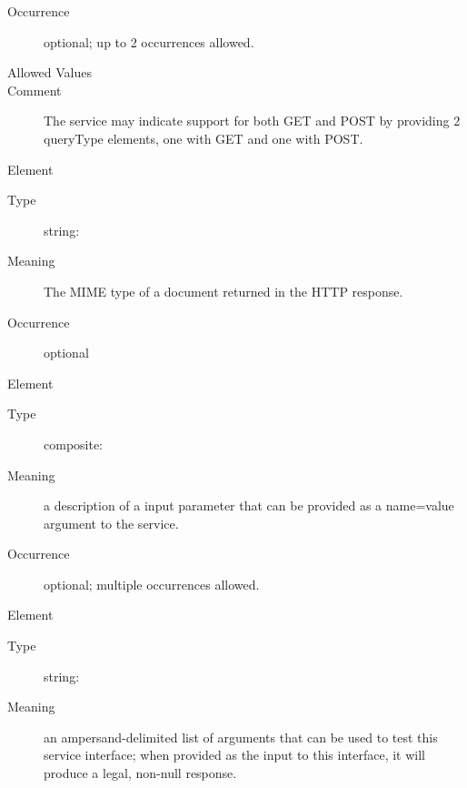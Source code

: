\documentclass[11pt,a4paper]{ivoa}
\begin{document}
\begin{generated}
\begin{bigdescription}
\begin{description}
\item[Occurrence] optional; up to 2 occurrences allowed.

\item[Allowed Values]\hfil
\begin{longtermsdescription}
\item[GET]
\item[POST]
\end{longtermsdescription}
\item[Comment] 
                       The service may indicate support for both GET
                       and POST by providing 2 queryType elements, one
                       with GET and one with POST.
                     

\end{description}
\item[Element \xmlel{resultType}]
\begin{description}
\item[Type] string: 
\item[Meaning] 
                       The MIME type of a document returned in the HTTP response.
                     
\item[Occurrence] optional

\end{description}
\item[Element \xmlel{param}]
\begin{description}
\item[Type] composite: 
\item[Meaning] 
                       a description of a input parameter that can be 
                       provided as a name=value argument to the service.  
                    
\item[Occurrence] optional; multiple occurrences allowed.

\end{description}
\item[Element \xmlel{testQuery}]
\begin{description}
\item[Type] string: 
\item[Meaning] 
                       an ampersand-delimited list of arguments that
                       can be used to test this service interface; 
                       when provided as the input to this interface,
                       it will produce a legal, non-null response.
                    

\end{description}
\end{bigdescription}
\end{generated}
\end{document}
